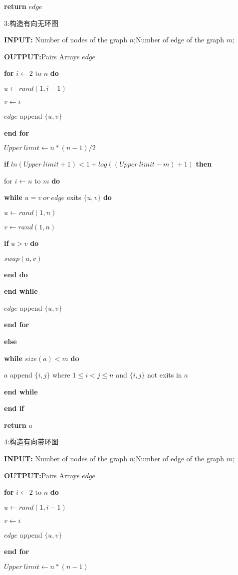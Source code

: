 \documentclass[
]{article}
\begin{document}
\textbf{return} \(edge\)

3:构造有向无环图

\textbf{INPUT:} Number of nodes of the graph \(n\);Number of edge of the
graph \(m\);

\textbf{OUTPUT:}Pairs Arrays \(edge\)

\textbf{for} \(i\gets 2\) to \(n\) \textbf{do}

\(u\gets rand(1,i-1)\)

\(v\gets i\)

\(edge\) append \(\{u,v\}\)

\textbf{end for}

\(Upper\ limit\gets n*(n-1)/2\)

\textbf{if} \(ln(Upper\ limit+1)<1+log((Upper\ limit-m)+1)\)
\textbf{then}

for \(i\gets n\) to \(m\) \textbf{do}

\textbf{while} \(u=v\ or\ edge\) exits \(\{u,v\}\) \textbf{do}

\(u\gets rand(1,n)\)

\(v\gets rand(1,n)\)

\textbf{if} \(u>v\) \textbf{do}

\(swap(u,v)\)

\textbf{end do}

\textbf{end while}

\(edge\) append \(\{u,v\}\)

\textbf{end for}

\textbf{else}

\textbf{while} \(size(a)< m\) \textbf{do}

\(a\) append \(\{i,j\}\) where \(1\leq i < j \leq n\) and \(\{i,j\}\)
not exits in \(a\)

\textbf{end while}

\textbf{end if}

\textbf{return} \(a\)

4:构造有向带环图

\textbf{INPUT:} Number of nodes of the graph \(n\);Number of edge of the
graph \(m\);

\textbf{OUTPUT:}Pairs Arrays \(edge\)

\textbf{for} \(i\gets 2\) to \(n\) \textbf{do}

\(u\gets rand(1,i-1)\)

\(v\gets i\)

\(edge\) append \(\{u,v\}\)

\textbf{end for}

\(Upper\ limit\gets n*(n-1)\)
\end{document}
